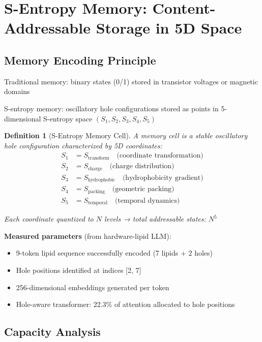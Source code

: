 \documentclass[11pt,a4paper]{article}
\newtheorem{definition}{Definition}[section]
\begin{document}
\section{S-Entropy Memory: Content-Addressable Storage in 5D Space}

\subsection{Memory Encoding Principle}

Traditional memory: binary states (0/1) stored in transistor voltages or magnetic domains

S-entropy memory: oscillatory hole configurations stored as points in 5-dimensional S-entropy space $(S_1, S_2, S_3, S_4, S_5)$

\begin{definition}[S-Entropy Memory Cell]
A memory cell is a stable oscillatory hole configuration characterized by 5D coordinates:
\begin{align}
S_1 &= S_{\text{transform}} \quad \text{(coordinate transformation)} \\
S_2 &= S_{\text{charge}} \quad \text{(charge distribution)} \\
S_3 &= S_{\text{hydrophobic}} \quad \text{(hydrophobicity gradient)} \\
S_4 &= S_{\text{packing}} \quad \text{(geometric packing)} \\
S_5 &= S_{\text{temporal}} \quad \text{(temporal dynamics)}
\end{align}

Each coordinate quantized to $N$ levels → total addressable states: $N^5$
\end{definition}

\textbf{Measured parameters} (from hardware-lipid LLM):
\begin{itemize}
\item 9-token lipid sequence successfully encoded (7 lipids + 2 holes)
\item Hole positions identified at indices [2, 7]
\item 256-dimensional embeddings generated per token
\item Hole-aware transformer: 22.3\% of attention allocated to hole positions
\end{itemize}

\subsection{Capacity Analysis}
\end{document}
